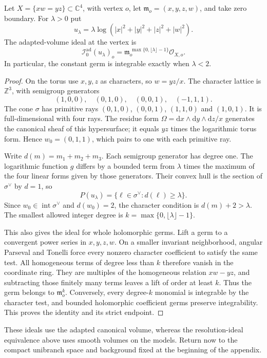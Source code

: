 \begin{proposition}\label{prop:quadric-threefold-adapted-ideal}
Let $X=\{xw=yz\}\subset\mathbb C^4$, with vertex $o$, let $\mathfrak m_o=(x,y,z,w)$, and take zero boundary. For $\lambda>0$ put
\[
 u_\lambda=\lambda\log(|x|^2+|y|^2+|z|^2+|w|^2).
\]
The adapted-volume ideal at the vertex is
\[
 \mathcal I_0^{\mathrm{ad}}(u_\lambda)_o
       =\mathfrak m_o^{\,\max\{0,\lfloor\lambda\rfloor-1\}}
                         \mathcal O_{X,o}.
\]
In particular, the constant germ is integrable exactly when $\lambda<2$.
\end{proposition}
\begin{proof}
On the torus use $x,y,z$ as characters, so $w=yz/x$. The character lattice is $\mathbb Z^3$, with semigroup generators
\[
 (1,0,0),\quad(0,1,0),\quad(0,0,1),\quad(-1,1,1).
\]
The cone $\sigma$ has primitive rays $(0,1,0)$, $(0,0,1)$, $(1,1,0)$ and $(1,0,1)$. It is full-dimensional with four rays. The residue form $\Omega=\mathrm dx\wedge\mathrm dy\wedge\mathrm dz/x$ generates the canonical sheaf of this hypersurface; it equals $yz$ times the logarithmic torus form. Hence $w_0=(0,1,1)$, which pairs to one with each primitive ray.

Write $d(m)=m_1+m_2+m_3$. Each semigroup generator has degree one. The logarithmic function $g$ differs by a bounded term from $\lambda$ times the maximum of the four linear forms given by those generators. Their convex hull is the section of $\sigma^\vee$ by $d=1$, so
\[
 P(u_\lambda)=\{\ell\in\sigma^\vee:d(\ell)\geq\lambda\}.
\]
Since $w_0\in\operatorname{int}\sigma^\vee$ and $d(w_0)=2$, the character condition is $d(m)+2>\lambda$. The smallest allowed integer degree is $k=\max\{0,\lfloor\lambda\rfloor-1\}$.

This also gives the ideal for whole holomorphic germs. Lift a germ to a convergent power series in $x,y,z,w$. On a smaller invariant neighborhood, angular Parseval and Tonelli force every nonzero character coefficient to satisfy the same test. All homogeneous terms of degree less than $k$ therefore vanish in the coordinate ring. They are multiples of the homogeneous relation $xw-yz$, and subtracting those finitely many terms leaves a lift of order at least $k$. Thus the germ belongs to $\mathfrak m_o^k$. Conversely, every degree-$k$ monomial is integrable by the character test, and bounded holomorphic coefficient germs preserve integrability. This proves the identity and its strict endpoint.
\end{proof}

These ideals use the adapted canonical volume, whereas the resolution-ideal equivalence above uses smooth volumes on the models. Return now to the compact unibranch space and background fixed at the beginning of the appendix.
